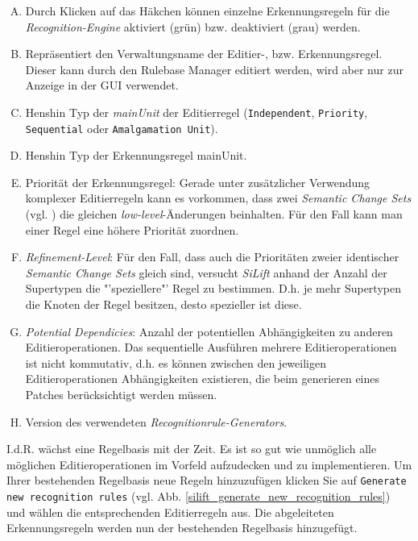 \documentclass[a4paper]{scrartcl}
\begin{document}
\begin{enumerate}[(A)]
\item Durch Klicken auf das Häkchen können einzelne Erkennungsregeln für die \textit{Recognition-Engine} aktiviert (grün) bzw. deaktiviert (grau) werden.

\item Repräsentiert den Verwaltungsname der Editier-, bzw. Erkennungsregel. Dieser kann durch den Rulebase Manager editiert werden, wird aber nur zur Anzeige in der GUI verwendet.

\item Henshin Typ der \textit{mainUnit} der Editierregel (\texttt{Independent}, \texttt{Priority}, \texttt{Sequential} oder \texttt{Amalgamation Unit}).

\item Henshin Typ der Erkennungsregel mainUnit.

\item Priorität der Erkennungsregel:
 Gerade unter zusätzlicher Verwendung komplexer Editierregeln kann es vorkommen, dass zwei \textit{Semantic Change Sets} (vgl. \pageref{page:semantic_change_sets}) die gleichen \textit{low-level}-Änderungen beinhalten. 
Für den Fall kann man einer Regel eine höhere Priorität zuordnen. 

\item \textit{Refinement-Level}: 
Für den Fall, dass auch die Prioritäten zweier identischer \textit{Semantic Change Sets} gleich sind, versucht \textit{SiLift} anhand der Anzahl der Supertypen die "'speziellere"' Regel zu bestimmen. 
D.h. je mehr Supertypen die Knoten der Regel besitzen, desto spezieller ist diese. 

\item \textit{Potential Dependicies}: 
Anzahl der potentiellen Abhängigkeiten zu anderen Editieroperationen. 
Das sequentielle Ausführen mehrere Editieroperationen ist nicht kommutativ, d.h. es können zwischen den jeweiligen Editieroperationen Abhängigkeiten existieren, die beim generieren eines Patches berücksichtigt werden müssen. 

\item Version des verwendeten \textit{Recognitionrule-Generators}.
\end{enumerate}

I.d.R. wächst eine Regelbasis mit der Zeit. 
Es ist so gut wie unmöglich alle möglichen Editieroperationen im Vorfeld aufzudecken und zu implementieren. 
Um Ihrer bestehenden Regelbasis neue Regeln hinzuzufügen klicken Sie auf \texttt{Generate new recognition rules} (vgl. Abb. \ref{silift_generate_new_recognition_rules}) und wählen die entsprechenden Editierregeln aus. 
Die abgeleiteten Erkennungsregeln werden nun der bestehenden Regelbasis hinzugefügt.
\end{document}
